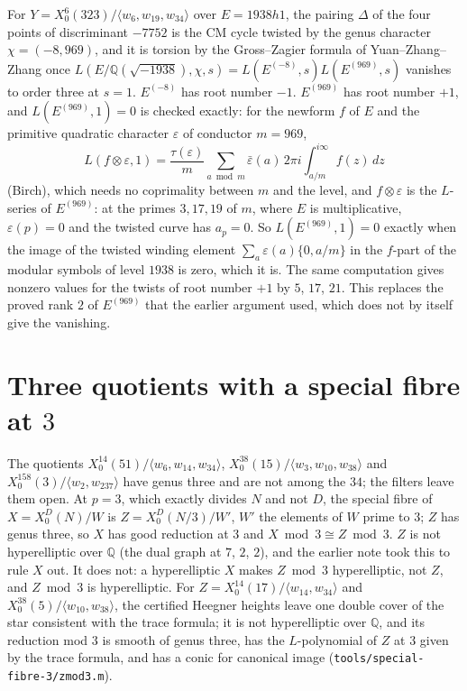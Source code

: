 \documentclass[11pt,reqno]{amsart}
\theoremstyle{plain}
\theoremstyle{definition}
\newcommand{\Q}{\mathbb{Q}}
\begin{document}
For $Y=X_0^6(323)/\langle w_6,w_{19},w_{34}\rangle$ over $E=1938h1$, the pairing $\Delta$ of the four points of
discriminant $-7752$ is the CM cycle twisted by the genus character $\chi=(-8,969)$, and it is torsion by the
Gross--Zagier formula of Yuan--Zhang--Zhang once $L(E/\Q(\sqrt{-1938}),\chi,s)=L(E^{(-8)},s)L(E^{(969)},s)$
vanishes to order three at $s=1$. $E^{(-8)}$ has root number $-1$. $E^{(969)}$ has root number $+1$, and
$L(E^{(969)},1)=0$ is checked exactly: for the newform $f$ of $E$ and the primitive quadratic character
$\varepsilon$ of conductor $m=969$,
\[
  L(f\otimes\varepsilon,1)=\frac{\tau(\varepsilon)}{m}\sum_{a\bmod m}\bar\varepsilon(a)\,
  2\pi i\!\int_{a/m}^{i\infty}\! f(z)\,dz
\]
(Birch), which needs no coprimality between $m$ and the level, and $f\otimes\varepsilon$ is the $L$-series of
$E^{(969)}$: at the primes $3,17,19$ of $m$, where $E$ is multiplicative, $\varepsilon(p)=0$ and the twisted curve
has $a_p=0$. So $L(E^{(969)},1)=0$ exactly when the image of the twisted winding element
$\sum_a\varepsilon(a)\{0,a/m\}$ in the $f$-part of the modular symbols of level $1938$ is zero, which it is. The
same computation gives nonzero values for the twists of root number $+1$ by $5$, $17$, $21$. This replaces the
proved rank $2$ of $E^{(969)}$ that the earlier argument used, which does not by itself give the vanishing.

\section{Three quotients with a special fibre at $3$}

The quotients $X_0^{14}(51)/\langle w_6,w_{14},w_{34}\rangle$, $X_0^{38}(15)/\langle w_3,w_{10},w_{38}\rangle$ and
$X_0^{158}(3)/\langle w_2,w_{237}\rangle$ have genus three and are not among the $34$; the filters leave them
open. At $p=3$, which exactly divides $N$ and not $D$, the special fibre of $X=X_0^D(N)/W$ is
$Z=X_0^D(N/3)/W'$, $W'$ the elements of $W$ prime to $3$; $Z$ has genus three, so $X$ has good reduction at
$3$ and $X\bmod 3\cong Z\bmod 3$. $Z$ is not hyperelliptic over $\Q$ (the dual graph at $7$, $2$, $2$), and the
earlier note took this to rule $X$ out. It does not: a hyperelliptic $X$ makes $Z\bmod 3$ hyperelliptic, not $Z$,
and $Z\bmod 3$ is hyperelliptic. For $Z=X_0^{14}(17)/\langle w_{14},w_{34}\rangle$ and $X_0^{38}(5)/\langle
w_{10},w_{38}\rangle$, the certified Heegner heights leave one double cover of the star consistent with the trace
formula; it is not hyperelliptic over $\Q$, and its reduction mod $3$ is smooth of genus three, has the
$L$-polynomial of $Z$ at $3$ given by the trace formula, and has a conic for canonical image
(\texttt{tools/special-fibre-3/zmod3.m}).
\end{document}

